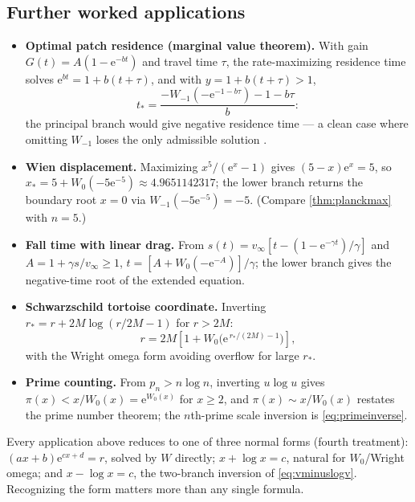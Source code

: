 \documentclass[11pt]{article}
\theoremstyle{remark}
\newcommand{\ee}{\mathrm e}
\begin{document}
\subsection{Further worked applications}

\begin{itemize}
\item\textbf{Optimal patch residence (marginal value theorem).}  With gain
\(G(t)=A(1-\ee^{-bt})\) and travel time \(\tau\), the rate-maximizing
residence time solves \(\ee^{bt}=1+b(t+\tau)\), and with \(y=1+b(t+\tau)>1\),
\begin{equation}\label{cmp:eq:patch}
 t_*=\frac{-W_{-1}(-\ee^{-1-b\tau})-1-b\tau}{b}:
\end{equation}
the principal branch would give negative residence time --- a clean case
where omitting \(W_{-1}\) loses the only admissible solution
\cite{lehtonen2016}.
\item\textbf{Wien displacement.}  Maximizing \(x^5/(\ee^x-1)\) gives
\((5-x)\ee^x=5\), so \(x_*=5+W_0(-5\ee^{-5})\approx4.9651142317\); the
lower branch returns the boundary root \(x=0\) via
\(W_{-1}(-5\ee^{-5})=-5\).  (Compare \cref{thm:planckmax} with \(n=5\).)
\item\textbf{Fall time with linear drag.}  From
\(s(t)=v_\infty[t-(1-\ee^{-\gamma t})/\gamma]\) and
\(A=1+\gamma s/v_\infty\ge1\),
\(t=[A+W_0(-\ee^{-A})]/\gamma\); the lower branch gives the negative-time
root of the extended equation.
\item\textbf{Schwarzschild tortoise coordinate.}  Inverting
\(r_*=r+2M\log(r/2M-1)\) for \(r>2M\):
\begin{equation}\label{cmp:eq:tortoise}
 r=2M\left[1+W_0\!\bigl(\ee^{\,r_*/(2M)-1}\bigr)\right],
\end{equation}
with the Wright omega form avoiding overflow for large \(r_*\).
\item\textbf{Prime counting.}  From \(p_n>n\log n\), inverting
\(u\log u\) gives
\(\pi(x)<x/W_0(x)=\ee^{W_0(x)}\) for \(x\ge2\), and
\(\pi(x)\sim x/W_0(x)\) restates the prime number theorem; the \(n\)th-prime
scale inversion is \eqref{eq:primeinverse}.
\end{itemize}

Every application above reduces to one of three normal forms (fourth
treatment): \((ax+b)\ee^{cx+d}=r\), solved by \(W\) directly;
\(x+\log x=c\), natural for \(W_0\)/Wright omega; and \(x-\log x=c\), the
two-branch inversion of \cref{eq:vminuslogv}.  Recognizing the form matters
more than any single formula.
\end{document}
